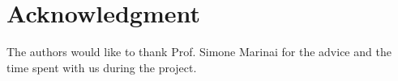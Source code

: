 \documentclass[journal]{IEEEtran}
\begin{document}
	\section*{Acknowledgment}
	The authors would like to thank Prof. Simone Marinai for the advice and the time spent with us during the project. 
	
	
	
	
	
	
	
	
	
\end{document}
